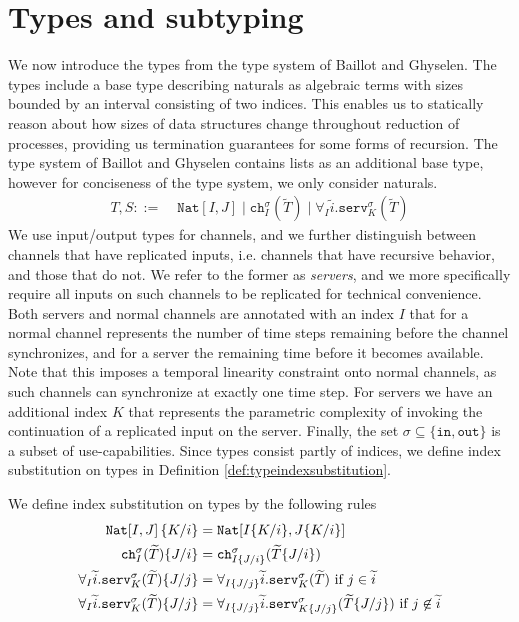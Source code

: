 \section{Types and subtyping}\label{sec:typesandsubs}
We now introduce the types from the type system of Baillot and Ghyselen. The types include a base type describing naturals as algebraic terms with sizes bounded by an interval consisting of two indices. This enables us to statically reason about how sizes of data structures change throughout reduction of processes, providing us termination guarantees for some forms of recursion. The type system of Baillot and Ghyselen contains lists as an additional base type, however for conciseness of the type system, we only consider naturals.
%
\begin{align*}
    T,S ::=&\; \texttt{Nat}[I,J] \mid \texttt{ch}_I^\sigma(\widetilde{T}) \mid \forall_I\widetilde{i}.\texttt{serv}_K^\sigma(\widetilde{T})
\end{align*}
%
We use input/output types for channels, and we further distinguish between channels that have replicated inputs, i.e. channels that have recursive behavior, and those that do not. We refer to the former as \textit{servers}, and we more specifically require all inputs on such channels to be replicated for technical convenience. Both servers and normal channels are annotated with an index $I$ that for a normal channel represents the number of time steps remaining before the channel synchronizes, and for a server the remaining time before it becomes available. Note that this imposes a temporal linearity constraint onto normal channels, as such channels can synchronize at exactly one time step. For servers we have an additional index $K$ that represents the parametric complexity of invoking the continuation of a replicated input on the server. Finally, the set $\sigma \subseteq \{\texttt{in},\texttt{out}\}$ is a subset of use-capabilities. Since types consist partly of indices, we define index substitution on types in Definition \ref{def:typeindexsubstitution}.\\

\begin{defi}\label{def:typeindexsubstitution}
    We define index substitution on types by the following rules
    \begin{align*}
        \texttt{Nat}\!\left[I,J\right]\{K/i\} &= \texttt{Nat}\!\left[I\{K/i\},J\{K/i\}\right]\\
        \texttt{ch}^{\sigma}_{I}(\widetilde{T})\{J/i\} &= \texttt{ch}^{\sigma}_{I\{J/i\}}(\widetilde{T}\{J/i\})\\
        \forall_{I} \widetilde{i}.\texttt{serv}^{\sigma}_{K}(\widetilde{T})\{J/j\} &= \forall_{I\{J/j\}} \widetilde{i}.\texttt{serv}^{\sigma}_{K}(\widetilde{T}) \text{ if } j \in \widetilde{i}\\
        \forall_{I} \widetilde{i}.\texttt{serv}^{\sigma}_{K}(\widetilde{T})\{J/j\} &= \forall_{I\{J/j\}} \widetilde{i}.\texttt{serv}^{\sigma}_{K\{J/j\}}(\widetilde{T}\{J/j\}) \text{ if } j \not\in \widetilde{i}
    \end{align*}
\end{defi}


